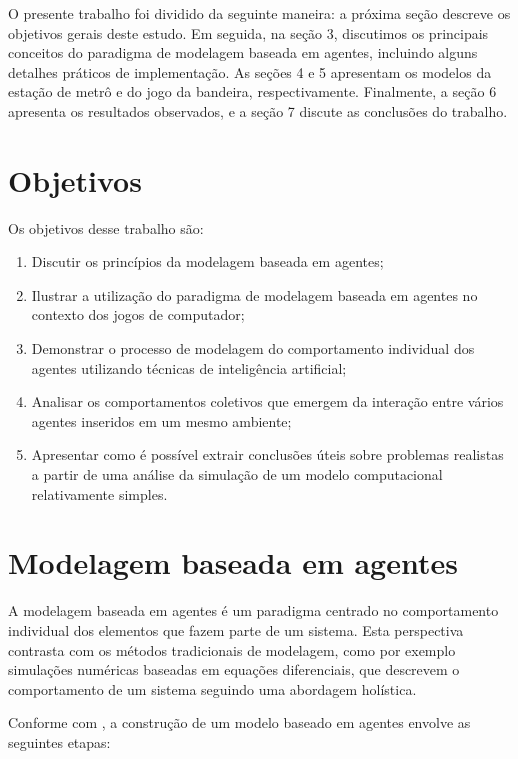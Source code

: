 \documentclass[preprint,12pt]{elsarticle}
\begin{document}
O presente trabalho foi dividido da seguinte maneira: a próxima seção descreve os objetivos gerais deste estudo. Em seguida, na seção 3, discutimos os principais conceitos do paradigma de modelagem baseada em agentes, incluindo alguns detalhes práticos de implementação. As seções 4 e 5 apresentam os modelos da estação de metrô e do jogo da bandeira, respectivamente. Finalmente, a seção 6 apresenta os resultados observados, e a seção 7 discute as conclusões do trabalho.

\section{Objetivos}
\label{sec:objetivos}

Os objetivos desse trabalho são:

\begin{enumerate}
	\item Discutir os princípios da modelagem baseada em agentes;
	\item Ilustrar a utilização do paradigma de modelagem baseada em agentes no contexto dos jogos de computador;
	\item Demonstrar o processo de modelagem do comportamento individual dos agentes utilizando técnicas de inteligência artificial;
	\item Analisar os comportamentos coletivos que emergem da interação entre vários agentes inseridos em um mesmo ambiente;
	\item Apresentar como é possível extrair conclusões úteis sobre problemas realistas a partir de uma análise da simulação de um modelo computacional relativamente simples.
\end{enumerate}

\newpage

\section{Modelagem baseada em agentes}
\label{sec:agentes}

A modelagem baseada em agentes é um paradigma centrado no comportamento individual dos elementos que fazem parte de um sistema. Esta perspectiva contrasta com os métodos tradicionais de modelagem, como por exemplo simulações numéricas baseadas em equações diferenciais, que descrevem o comportamento de um sistema seguindo uma abordagem holística.

Conforme com \citet{macal2005tutorial}, a construção de um modelo baseado em agentes envolve as seguintes etapas:
\end{document}
